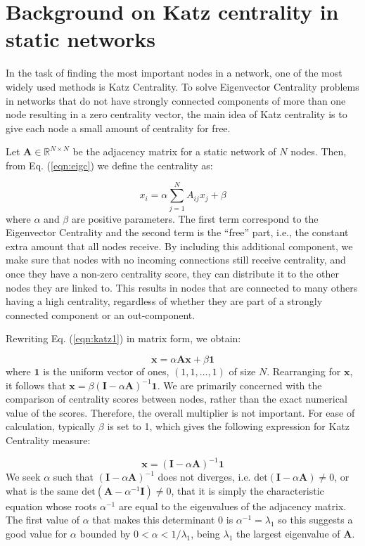 \section{Background on Katz centrality in static networks}
\label{sec:back}
In the task of finding the most important nodes in a network, one of the most widely used methods is Katz Centrality. To solve Eigenvector Centrality problems in networks that do not have strongly connected components of more than one node resulting in a zero centrality vector, the main idea of Katz centrality is to give each node a small amount of centrality for free. 

Let $\mathbf{A}\in\mathbb{R}^{N\times N}$ be the adjacency matrix for a static network of $N$ nodes. Then, from Eq. (\ref{eqn:eigc}) we define the centrality as:

\begin{equation}
\label{eqn:katz1}
    x_i= \alpha\sum_{j=1}^{N}A_{ij}x_j + \beta
\end{equation}
where $\alpha$ and $\beta$ are positive parameters. The first term correspond to the Eigenvector Centrality and the second term is the “free” part, i.e., the constant extra amount that all nodes receive. By including this additional component, we make sure that nodes with no incoming connections still receive centrality, and once they have a non-zero centrality score, they can distribute it to the other nodes they are linked to. This results in nodes that are connected to many others having a high centrality, regardless of whether they are part of a strongly connected component or an out-component.

Rewriting Eq. (\ref{eqn:katz1}) in matrix form, we obtain:

\begin{equation}
\label{eqn:katz2}
    \mathbf{x}= \alpha\mathbf{Ax} + \beta\mathbf{1}
\end{equation}
where $\mathbf{1}$ is the uniform vector of ones, $(1,1,\dots,1)$ of size $N$. Rearranging for $\mathbf{x}$, it follows that $\mathbf{x} = \beta (\mathbf{I}-\alpha\mathbf{A})^{-1}\mathbf{1}$.
We are primarily concerned with the comparison of centrality scores between nodes, rather than the exact numerical value of the scores. Therefore, the overall multiplier is not important. For ease of calculation, typically $\beta$ is set to 1, which gives the following expression for Katz Centrality measure:

\begin{equation}
\label{eqn:katz3}
    \mathbf{x} = (\mathbf{I}-\alpha\mathbf{A})^{-1}\mathbf{1}
\end{equation}
We seek $\alpha$ such that $(\mathbf{I}-\alpha\mathbf{A})^{-1}$ does not diverges, i.e. $\text{det}(\mathbf{I}-\alpha\mathbf{A})\neq 0$, or what is the same $\text{det}(\mathbf{A}-\alpha^{-1}\mathbf{I})\neq 0$, that it is simply the characteristic equation whose roots $\alpha^{-1}$ are equal to the eigenvalues of the adjacency matrix. The first value of $\alpha$ that makes this determinant $0$ is $\alpha^{-1}=\lambda_1$ so this suggests a good value for $\alpha$ bounded by $0 < \alpha < 1/\lambda_1 $, being $\lambda_1$ the largest eigenvalue of $\mathbf{A}$. 

